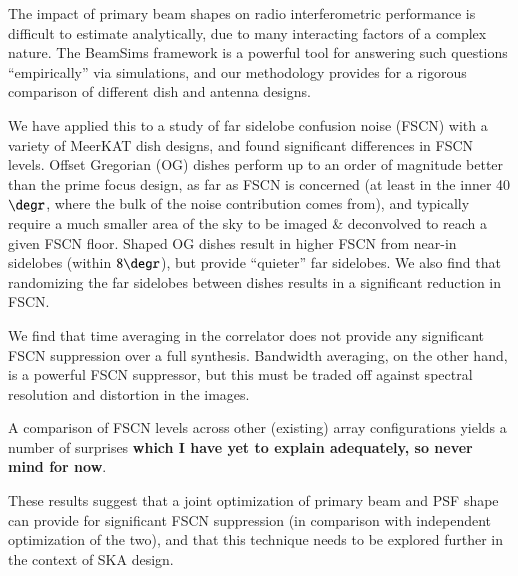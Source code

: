 \documentclass{aa}
\begin{document}
The impact of primary beam shapes on radio interferometric performance is difficult to estimate analytically, due to many interacting factors of a complex nature. The BeamSims framework is a powerful tool for answering such questions ``empirically'' via simulations, and our methodology provides for a rigorous comparison of different dish and antenna designs.

We have applied this to a study of far sidelobe confusion noise (FSCN) with a variety of MeerKAT dish designs, and found significant differences in FSCN levels. Offset Gregorian (OG) dishes perform up to an order of magnitude better than the prime focus design, as far as FSCN is concerned (at least in the inner 40$\degr$, where the bulk of the noise contribution comes from), and typically require a much smaller area of the sky to be imaged \& deconvolved to reach a given FSCN floor. Shaped OG dishes result in higher FSCN from near-in sidelobes (within $8\degr$), but provide ``quieter'' far sidelobes. We also find that randomizing the far sidelobes between dishes results in a significant reduction in FSCN.

We find that time averaging in the correlator does not provide any significant FSCN suppression over a full synthesis. Bandwidth averaging, on the other hand, is a powerful FSCN suppressor, but this must be traded off against spectral resolution and distortion in the images.

A comparison of FSCN levels across other (existing) array configurations yields a number of surprises {\bf which I have yet to explain adequately, so never mind for now}.

These results suggest that a joint optimization of primary beam and PSF shape can provide for significant FSCN suppression (in comparison with independent optimization of the two), and that this technique needs to be explored further in the context of SKA design.





\end{document}
